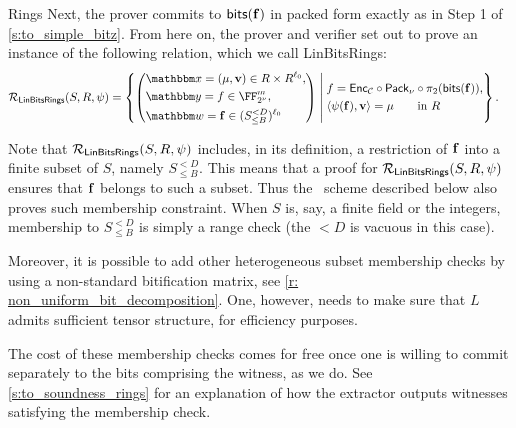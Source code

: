 \begin{lncsmove}{Rings}
     \noindent Next, the prover commits to $\mathsf{bits}(\mathbf{f})$ in packed form exactly as in Step 1 of \cref{s:to_simple_bitz}. From here on, the prover and verifier set out to prove an instance of the following relation, which we call LinBitsRings:
%
    \begin{align*}
 &\LinModFieldBin(S, R, \psi) = \left\{ \left(\begin{aligned} &\inp=(\mu, \vv)\in R  \times R^{ \codedim_0}, \\
 &\oracle = f \in \comfield^{\codelength}, \\ &\wit= \bff\in (S_{\leq B}^{<D})^{\codedim_0}\end{aligned}\right) \;\middle|\;  \begin{aligned}  
 &f = \Enc_{\cC}\circ \pack\circ\pi_2(\bitstext(\bff)),\\
 &\langle \psi(\bff), \vv \rangle = \mu  \qquad  \text{in } R
 \end{aligned} \right\}.
\end{align*}

\begin{remark}\label{r:integrated_range_checks}
    Note that $\mathcal{R}_{\mathsf{LinBitsRings}}(S, R, \psi) $ includes, in its definition, a restriction of $\mathbf{f}$ into a finite subset of $S$, namely $S_{\leq B}^{<D}$. This means that a proof for $\mathcal{R}_{\mathsf{LinBitsRings}}(S, R, \psi)$ ensures that $\mathbf{f}$ belongs to such a subset. Thus the \ftwoz\ scheme described below also proves such membership constraint. When $S$ is, say, a finite field or the integers, membership to $S_{\leq B}^{<D}$ is simply a range check (the $<D$ is vacuous in this case). 

\iflncs\else %
    Moreover, it is possible to add other heterogeneous subset membership checks by using a non-standard bitification matrix, see \cref{r: non_uniform_bit_decomposition}. One, however, needs to make sure that $L$ admits sufficient tensor structure, for efficiency purposes.

    The cost of these membership checks comes for free once one is willing to commit separately to the bits comprising the witness, as we do. See \cref{s:to_soundness_rings} for an explanation of how the extractor outputs witnesses satisfying the membership check.
\fi
\end{remark}


\end{lncsmove}
